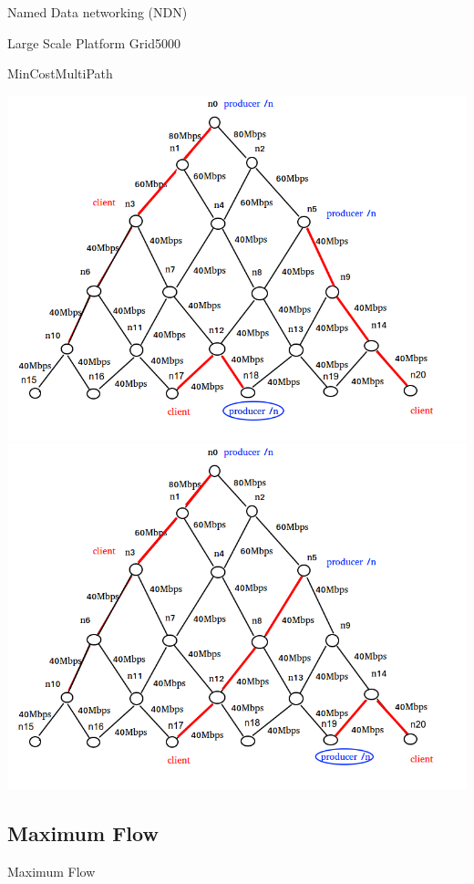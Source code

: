 \documentclass[8pt]{beamer}
\newcommand{\1}{\mathbbm 1}
\begin{document}
\begin{frame}{Named Data networking (NDN)}
\begin{frame}{Large Scale Platform Grid5000}
\begin{frame}{MinCostMultiPath}
{\includegraphics[scale=0.20]{figures/Step1.png} 
\includegraphics[scale=0.20]{figures/Step2.png} 


}



\end{frame}




\subsection{Maximum Flow}

\begin{frame}{Maximum Flow}


\end{frame}
\end{frame}
\end{frame}
\end{document}

